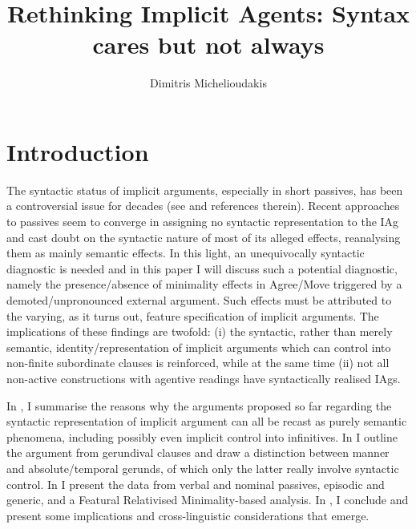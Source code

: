 \documentclass[output=paper]{langsci/langscibook}
\author{Dimitris Michelioudakis\affiliation{Aristotle University of Thessaloniki}}
\title{Rethinking Implicit Agents: Syntax cares but not always}
\begin{document}
\glsresetall
\maketitle

\section{Introduction}\label{sec:key:22.1}

The syntactic status of implicit arguments, especially in short
passives, has been a controversial issue for decades (see
\citealt{Roberts1985,Roberts:1987a,Jaeggli1986,Roeper1984,Williams1985,Williams1987,BhattPancheva2006}
and references therein). Recent approaches to passives
\parencite[e.g.][]{Bruening2014,Schafer2012b,AlexiadouEtAl2015} seem to converge
in assigning no syntactic representation to the \gls{IAg} and cast doubt on the
syntactic nature of most of its alleged effects, reanalysing them as mainly
semantic effects. In this light, an unequivocally syntactic diagnostic is
needed and in this paper I will discuss such a potential diagnostic, namely the
presence/absence of minimality effects in Agree/Move triggered by a
demoted/unpronounced external argument. Such effects must be attributed to the
varying, as it turns out, feature specification of implicit arguments. The
implications of these findings are twofold: (i) the syntactic, rather than
merely semantic, identity/representation of implicit arguments which can
control into non-finite subordinate clauses is reinforced, while at the same
time (ii) not all non-active constructions with agentive readings have
syntactically realised \glspl{IAg}.

In , I summarise the reasons why the arguments proposed so
far regarding the syntactic representation of implicit argument can all be recast as purely semantic phenomena, including possibly
even implicit control into infinitives. In
 I outline the argument from  gerundival clauses
and draw a distinction between manner and absolute/temporal gerunds, of which
only the latter really involve syntactic control. In  I
present the data from verbal and nominal passives, episodic and
generic, and a Featural Relativised Minimality-based analysis. In
, I conclude and present some implications and
cross-linguistic considerations that emerge.
\end{document}
